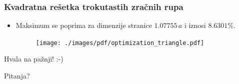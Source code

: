 \documentclass{beamer}
\begin{document}
\begin{frame}
    \frametitle{Kvadratna rešetka trokutastih zračnih rupa}
    \begin{itemize}
		\item Maksimum se poprima za dimenzije stranice $1.07755 \, a$ i iznosi
			$8.6301 \%$.
    \begin{figure}[ht]
        \centering
        \texttt{[image: ./images/pdf/optimization\_triangle.pdf]}
    \end{figure}
    \end{itemize}
\end{frame}

\begin{frame}[standout]
	Hvala na pažnji! :-)

    Pitanja?
\end{frame}
\end{document}
